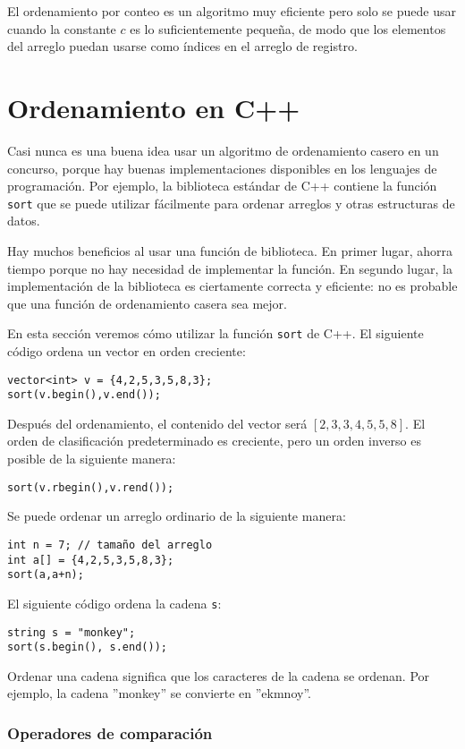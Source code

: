 El ordenamiento por conteo es un algoritmo muy eficiente
pero solo se puede usar cuando la constante $c$
es lo suficientemente pequeña, de modo que los elementos del arreglo puedan
usarse como índices en el arreglo de registro.

\section{Ordenamiento en C++}


Casi nunca es una buena idea usar
un algoritmo de ordenamiento casero
en un concurso, porque hay buenas
implementaciones disponibles en los lenguajes de programación.
Por ejemplo, la biblioteca estándar de C++ contiene
la función \texttt{sort} que se puede utilizar fácilmente para
ordenar arreglos y otras estructuras de datos.

Hay muchos beneficios al usar una función de biblioteca.
En primer lugar, ahorra tiempo porque no hay necesidad de
implementar la función.
En segundo lugar, la implementación de la biblioteca es
ciertamente correcta y eficiente: no es probable
que una función de ordenamiento casera sea mejor.

En esta sección veremos cómo utilizar la
función \texttt{sort} de C++.
El siguiente código ordena
un vector en orden creciente:
\begin{lstlisting}
vector<int> v = {4,2,5,3,5,8,3};
sort(v.begin(),v.end());
\end{lstlisting}
Después del ordenamiento, el contenido del
vector será
$[2,3,3,4,5,5,8]$.
El orden de clasificación predeterminado es creciente,
pero un orden inverso es posible de la siguiente manera:
\begin{lstlisting}
sort(v.rbegin(),v.rend());
\end{lstlisting}
Se puede ordenar un arreglo ordinario de la siguiente manera:
\begin{lstlisting}
int n = 7; // tamaño del arreglo
int a[] = {4,2,5,3,5,8,3};
sort(a,a+n);
\end{lstlisting}
\newpage
El siguiente código ordena la cadena \texttt{s}:
\begin{lstlisting}
string s = "monkey";
sort(s.begin(), s.end());
\end{lstlisting}
Ordenar una cadena significa que los caracteres
de la cadena se ordenan.
Por ejemplo, la cadena ''monkey'' se convierte en ''ekmnoy''.

\subsubsection{Operadores de comparación}

